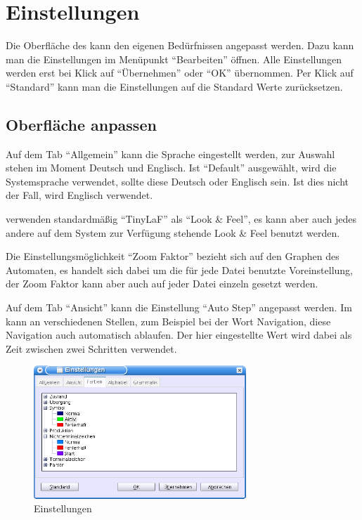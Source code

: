 \chapter{Einstellungen}\label{Preferences}

Die Oberfläche des \gtitools kann den eigenen Bedürfnissen angepasst werden.
Dazu kann man die Einstellungen im Menüpunkt "`Bearbeiten"' öffnen. Alle
Einstellungen werden erst bei Klick auf "`Übernehmen"' oder "`OK"' übernommen.
Per Klick auf "`Standard"' kann man die Einstellungen auf die Standard Werte
zurücksetzen.


\section{Oberfläche anpassen}

Auf dem Tab "`Allgemein"' kann die Sprache eingestellt werden, zur Auswahl
stehen im Moment Deutsch und Englisch. Ist "`Default"' ausgewählt, wird
die Systemsprache verwendet, sollte diese Deutsch oder Englisch sein. Ist dies
nicht der Fall, wird Englisch verwendet.\vspace{10pt}

\gtitool verwenden standardmäßig "`TinyLaF"' als "`Look \& Feel"', es kann aber
auch jedes andere auf dem System zur Verfügung stehende Look \& Feel benutzt
werden.\vspace{10pt}

Die Ein\-stell\-ungs\-möglich\-keit "`Zoom Faktor"' bezieht sich auf den Graphen 
des Automaten, es handelt sich dabei um die für jede Datei benutzte Voreinstellung,
der Zoom Faktor kann aber auch auf jeder Datei einzeln gesetzt werden.\vspace{10pt}

Auf dem Tab "`Ansicht"' kann die Einstellung "`Auto Step"' angepasst werden. Im
\gtitool kann an verschiedenen Stellen, zum Beispiel bei der Wort Navigation, diese
Navigation auch automatisch ablaufen. Der hier eingestellte Wert wird dabei
als Zeit zwischen zwei Schritten verwendet.\vspace{10pt}

\begin{figure}[h]
\begin{center}
\includegraphics[width=8cm]{images/preferences.png}
\caption{Einstellungen}
\end{center}
\end{figure}


